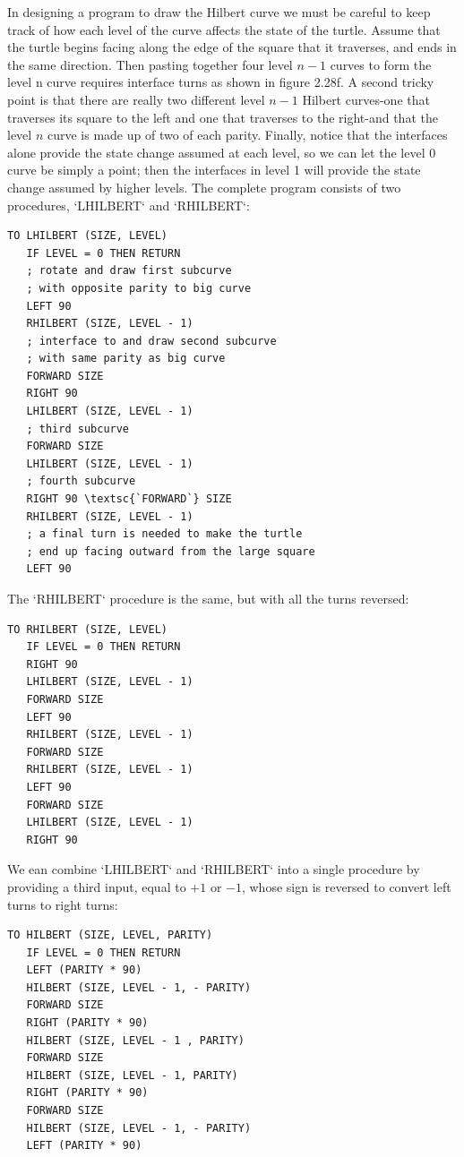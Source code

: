 \documentclass{book}
\begin{document}
In designing a program to draw the Hilbert curve we must be careful
to keep track of how each level of the curve affects the state of the turtle.
Assume that the turtle begins facing along the edge of the square that
it traverses, and ends in the same direction. Then pasting together four
level $n - 1$ curves to form the level n curve requires interface turns as
shown in figure 2.28f. A second tricky point is that there are really two
different level $n - 1$ Hilbert curves-one that traverses its square to the
left and one that traverses to the right-and that the level $n$ curve is
made up of two of each parity. Finally, notice that the interfaces alone
provide the state change assumed at each level, so we can let the level
0 curve be simply a point; then the interfaces in level 1 will provide the
state change assumed by higher levels. The complete program consists
of two procedures, \textsc{`LHILBERT`} and \textsc{`RHILBERT`}:

\begin{verbatim}
TO LHILBERT (SIZE, LEVEL)
   IF LEVEL = 0 THEN RETURN
   ; rotate and draw first subcurve
   ; with opposite parity to big curve
   LEFT 90
   RHILBERT (SIZE, LEVEL - 1)
   ; interface to and draw second subcurve
   ; with same parity as big curve
   FORWARD SIZE
   RIGHT 90
   LHILBERT (SIZE, LEVEL - 1)
   ; third subcurve
   FORWARD SIZE
   LHILBERT (SIZE, LEVEL - 1)
   ; fourth subcurve
   RIGHT 90 \textsc{`FORWARD`} SIZE
   RHILBERT (SIZE, LEVEL - 1)
   ; a final turn is needed to make the turtle
   ; end up facing outward from the large square
   LEFT 90
\end{verbatim}
The \textsc{`RHILBERT`} procedure is the same, but with all the turns reversed:

\begin{verbatim}
TO RHILBERT (SIZE, LEVEL)
   IF LEVEL = 0 THEN RETURN
   RIGHT 90
   LHILBERT (SIZE, LEVEL - 1)
   FORWARD SIZE
   LEFT 90
   RHILBERT (SIZE, LEVEL - 1)
   FORWARD SIZE
   RHILBERT (SIZE, LEVEL - 1)
   LEFT 90
   FORWARD SIZE
   LHILBERT (SIZE, LEVEL - 1)
   RIGHT 90
\end{verbatim}
We ean combine \textsc{`LHILBERT`} and \textsc{`RHILBERT`} into a single procedure by
providing a third input, equal to $+1$ or $-1$, whose sign is reversed to
convert left turns to right turns:

\begin{verbatim}
TO HILBERT (SIZE, LEVEL, PARITY)
   IF LEVEL = 0 THEN RETURN
   LEFT (PARITY * 90)
   HILBERT (SIZE, LEVEL - 1, - PARITY)
   FORWARD SIZE
   RIGHT (PARITY * 90)
   HILBERT (SIZE, LEVEL - 1 , PARITY)
   FORWARD SIZE
   HILBERT (SIZE, LEVEL - 1, PARITY)
   RIGHT (PARITY * 90)
   FORWARD SIZE
   HILBERT (SIZE, LEVEL - 1, - PARITY)
   LEFT (PARITY * 90)
\end{verbatim}
\end{document}
